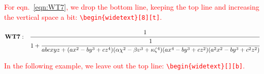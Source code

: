 \begin{table}[b]
\caption{\label{tab:3}Table at full column width with columns in math mode}
\end{table}

\lipsum[40-48]

\textcolor{red}{For eqn.~\eqref{eqn:WT7}, we drop the bottom line, keeping the top line and increasing the vertical space a bit: \texttt{\textbackslash begin\{widetext\}[8][t]}.}

\begin{widetext}[8][t]
\begin{equation}\label{eqn:WT7}
\mathbf{WT7:}\quad
\cfrac{1}{1+ \cfrac{1}{abcxyz+(ax^2-by^3+cz^4)(\alpha\chi^2-\beta\upsilon^3+\kappa\zeta^4)(ax^4-by^3+cz^2)(a^2x^2-by^3+c^2z^2)}}
\end{equation}
\end{widetext}

\lipsum[50-60]

\textcolor{red}{In the following example, we leave out the top line: \texttt{\textbackslash begin\{widetext\}[][b]}.}

\vskip 80pt%

